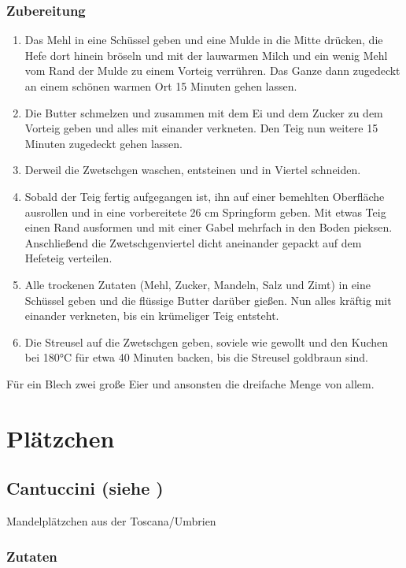 \subsection*{Zubereitung}
\begin{enumerate}
	\item Das Mehl in eine Schüssel geben und eine Mulde in die Mitte drücken, die Hefe dort hinein bröseln und mit der lauwarmen Milch und ein wenig Mehl vom Rand der Mulde zu einem Vorteig verrühren. Das Ganze dann zugedeckt an einem schönen warmen Ort 15 Minuten gehen lassen.
	\item Die Butter schmelzen und zusammen mit dem Ei und dem Zucker zu dem Vorteig geben und alles mit einander verkneten. Den Teig nun weitere 15 Minuten zugedeckt gehen lassen.
	\item Derweil die Zwetschgen waschen, entsteinen und in Viertel schneiden.
	\item Sobald der Teig fertig aufgegangen ist, ihn auf einer bemehlten Oberfläche ausrollen und in eine vorbereitete 26 cm Springform geben. Mit etwas Teig einen Rand ausformen und mit einer Gabel mehrfach in den Boden pieksen. Anschließend die Zwetschgenviertel dicht aneinander gepackt auf dem Hefeteig verteilen.
	\item Alle trockenen Zutaten (Mehl, Zucker, Mandeln, Salz und Zimt) in eine Schüssel geben und die flüssige Butter darüber gießen. Nun alles kräftig mit einander verkneten, bis ein krümeliger Teig entsteht.
	\item Die Streusel auf die Zwetschgen geben, soviele wie gewollt und den Kuchen bei 180°C für etwa 40 Minuten backen, bis die Streusel goldbraun sind.
\end{enumerate}

Für ein Blech zwei große Eier und ansonsten die dreifache Menge von allem.

\chapter{Plätzchen}

\section[Cantuccini]{Cantuccini \textmd{(siehe \cite{ChefkochCantuccini})}}
Mandelplätzchen aus der Toscana/Umbrien
\subsection*{Zutaten}

